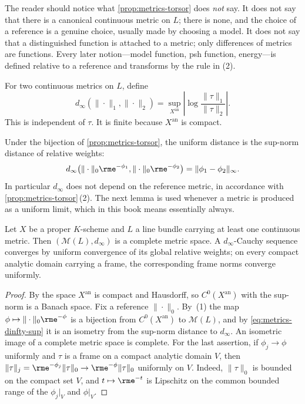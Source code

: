 The reader should notice what \cref{prop:metrics-torsor} does \emph{not}
say. It does not say that there is a canonical continuous metric on $L$;
there is none, and the choice of a reference is a genuine choice, usually
made by choosing a model. It does not say that a distinguished function is
attached to a metric; only differences of metrics are functions. Every later
notion---model function, psh function, energy---is defined relative to a
reference and transforms by the rule in (2).

\begin{definition}
\label{def:metrics-uniform-distance}
For two continuous metrics on $L$, define
\[
 d_\infty(\|\cdot\|_1,\|\cdot\|_2)
 =\sup_{X^{\mathrm{an}}}
    \left|\log\frac{\|\tau\|_1}{\|\tau\|_2}\right|.
\]
This is independent of $\tau$. It is finite because $X^{\mathrm{an}}$
is compact.
\end{definition}

Under the bijection of \cref{prop:metrics-torsor}, the uniform distance is
the sup-norm distance of relative weights:
\begin{equation}
\label{eq:metrics-dinfty-sup}
 d_\infty\bigl(\|\cdot\|_0\rme^{-\phi_1},\|\cdot\|_0\rme^{-\phi_2}\bigr)
 =\|\phi_1-\phi_2\|_\infty .
\end{equation}
In particular $d_\infty$ does not depend on the reference metric, in
accordance with \cref{prop:metrics-torsor}\,(2). The next lemma is used
whenever a metric is produced as a uniform limit, which in this book means
essentially always.

\begin{lemma}
\label{lem:metrics-dinfty-complete}
Let $X$ be a proper $K$-scheme and $L$ a line bundle carrying at least
one continuous metric. Then $(\mathcal M(L),d_\infty)$ is a complete
metric space. A $d_\infty$-Cauchy sequence converges by uniform convergence
of its global relative weights; on every compact analytic domain carrying a
frame, the corresponding frame norms converge uniformly.
\end{lemma}

\begin{proof}
By  the space $X^{\mathrm{an}}$ is compact
and Hausdorff, so $C^0(X^{\mathrm{an}})$ with the sup-norm is a Banach
space. Fix a reference $\|\cdot\|_0$. By \,(1)
the map $\phi\mapsto\|\cdot\|_0\rme^{-\phi}$ is a bijection from
$C^0(X^{\mathrm{an}})$ to $\mathcal M(L)$, and by
\eqref{eq:metrics-dinfty-sup} it is an isometry from the sup-norm distance
to $d_\infty$. An isometric image of a complete metric space is complete.
For the last assertion, if $\phi_j\to\phi$ uniformly and $\tau$ is a
frame on a compact analytic domain $V$, then
$\|\tau\|_j=\rme^{-\phi_j}\|\tau\|_0\to\rme^{-\phi}\|\tau\|_0$ uniformly
on $V$. Indeed, $\|\tau\|_0$ is bounded on the compact set $V$, and
$t\mapsto\rme^{-t}$ is Lipschitz on the common bounded range of the
$\phi_j|_V$ and $\phi|_V$.
\end{proof}

